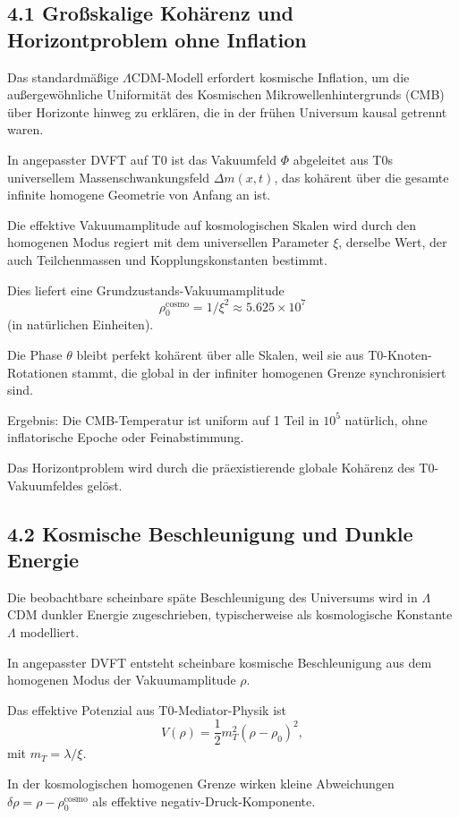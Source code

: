 	\subsection{4.1 Großskalige Kohärenz und Horizontproblem ohne Inflation}
	
	Das standardmäßige $\Lambda$CDM-Modell erfordert kosmische Inflation, um die außergewöhnliche Uniformität des Kosmischen Mikrowellenhintergrunds (CMB) über Horizonte hinweg zu erklären, die in der frühen Universum kausal getrennt waren.
	
	In angepasster DVFT auf T0 ist das Vakuumfeld $\Phi$ abgeleitet aus T0s universellem Massenschwankungsfeld $\Delta m(x,t)$, das kohärent über die gesamte infinite homogene Geometrie von Anfang an ist.
	
	Die effektive Vakuumamplitude auf kosmologischen Skalen wird durch den homogenen Modus regiert mit dem universellen Parameter $\xi$, derselbe Wert, der auch Teilchenmassen und Kopplungskonstanten bestimmt.
	
	Dies liefert eine Grundzustands-Vakuumamplitude
	\[
	\rho_0^{\text{cosmo}} = 1 / \xi^2 \approx 5.625 \times 10^7
	\]
	(in natürlichen Einheiten).
	
	Die Phase $\theta$ bleibt perfekt kohärent über alle Skalen, weil sie aus T0-Knoten-Rotationen stammt, die global in der infiniter homogenen Grenze synchronisiert sind.
	
	Ergebnis: Die CMB-Temperatur ist uniform auf 1 Teil in $10^5$ natürlich, ohne inflatorische Epoche oder Feinabstimmung.
	
	Das Horizontproblem wird durch die präexistierende globale Kohärenz des T0-Vakuumfeldes gelöst.
	
	\subsection{4.2 Kosmische Beschleunigung und Dunkle Energie}
	
	Die beobachtbare scheinbare späte Beschleunigung des Universums wird in $\Lambda$CDM dunkler Energie zugeschrieben, typischerweise als kosmologische Konstante $\Lambda$ modelliert.
	
	In angepasster DVFT entsteht scheinbare kosmische Beschleunigung aus dem homogenen Modus der Vakuumamplitude $\rho$.
	
	Das effektive Potenzial aus T0-Mediator-Physik ist
	\[
	V(\rho) = \frac{1}{2} m_T^2 (\rho - \rho_0)^2,
	\]
	mit $m_T = \lambda / \xi$.
	
	In der kosmologischen homogenen Grenze wirken kleine Abweichungen $\delta \rho = \rho - \rho_0^{\text{cosmo}}$ als effektive negativ-Druck-Komponente.
	
